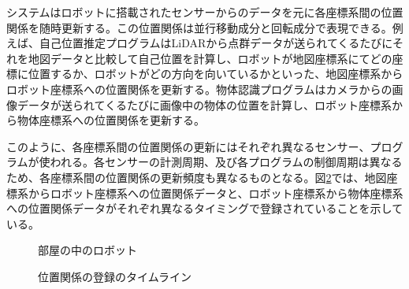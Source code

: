 \documentclass[a4paper]{jreport}	%
\begin{document}
システムはロボットに搭載されたセンサーからのデータを元に各座標系間の位置関係を随時更新する。この位置関係は並行移動成分と回転成分で表現できる。例えば、自己位置推定プログラムはLiDARから点群データが送られてくるたびにそれを地図データと比較して自己位置を計算し、ロボットが地図座標系にてどの座標に位置するか、ロボットがどの方向を向いているかといった、地図座標系からロボット座標系への位置関係を更新する。物体認識プログラムはカメラからの画像データが送られてくるたびに画像中の物体の位置を計算し、ロボット座標系から物体座標系への位置関係を更新する。

このように、各座標系間の位置関係の更新にはそれぞれ異なるセンサー、プログラムが使われる。各センサーの計測周期、及び各プログラムの制御周期は異なるため、各座標系間の位置関係の更新頻度も異なるものとなる。図\ref{fig:sensor-sync}では、地図座標系からロボット座標系への位置関係データと、ロボット座標系から物体座標系への位置関係データがそれぞれ異なるタイミングで登録されていることを示している。



\begin{figure}[h] 
\caption{部屋の中のロボット}
\label{fig:room}
\end{figure}

\begin{figure}[h] 
\caption{位置関係の登録のタイムライン}
\label{fig:sensor-sync}
\end{figure}
\end{document}
